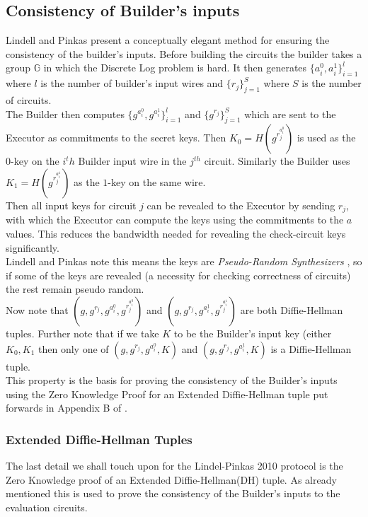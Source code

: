 \documentclass[ %
                    author={Nicholas Tutte},
                supervisor={Prof. Nigel Smart},
                    degree={MEng},
                     title={Secure Two Party Computation},
                  subtitle={A practical comparison of recent protocols},
                      type={Research - GG1K},
                      year={2015} ]{dissertation}
\begin{document}
			\subsection{Consistency of Builder's inputs}
				Lindell and Pinkas present a conceptually elegant method for ensuring the consistency of the builder's inputs. Before building the circuits the builder takes a group $\mathbb{G}$ in which the Discrete Log problem is hard. It then generates $\{a_i^0, a_i^1\}_{i = 1}^{l}$ where $l$ is the number of builder's input wires and $\{r_j\}_{j = 1}^{S}$ where $S$ is the number of circuits.\\

				The Builder then computes $\{g^{a_i^0}, g^{a_i^1}\}_{i = 1}^{l}$ and $\{g^{r_j}\}_{j = 1}^{S}$ which are sent to the Executor as commitments to the secret keys. Then $K_0 = H(g^{r_j^{a_i^0}})$ is used as the $0$-key on the $i^th$ Builder input wire in the $j^{th}$ circuit. Similarly the Builder uses $K_1 = H(g^{r_j^{a_i^1}})$ as the $1$-key on the same wire.\\

				Then all input keys for circuit $j$ can be revealed to the Executor by sending $r_j$, with which the Executor can compute the keys using the commitments to the $a$ values. This reduces the bandwidth needed for revealing the check-circuit keys significantly.\\

				Lindell and Pinkas note this means the keys are \emph{Pseudo-Random Synthesizers} \cite{PseudoRandomSynth}, so if some of the keys are revealed (a necessity for checking correctness of circuits) the rest remain pseudo random.\\

				Now note that $(g, g^{r_j}, g^{a_i^0}, g^{r_j^{a_i^0}})$ and $(g, g^{r_j}, g^{a_i^1}, g^{r_j^{a_i^1}})$ are both Diffie-Hellman tuples. Further note that if we take $K$ to be the Builder's input key (either $K_0, K_1$  then only one of $(g, g^{r_j}, g^{a_i^0}, K)$ and $(g, g^{r_j}, g^{a_i^1}, K)$ is a Diffie-Hellman tuple.\\

				This property is the basis for proving the consistency of the Builder's inputs using the Zero Knowledge Proof for an Extended Diffie-Hellman tuple put forwards in Appendix B of \cite{LindellAndPinkas2011}.

				\subsubsection{Extended Diffie-Hellman Tuples}
					The last detail we shall touch upon for the Lindel-Pinkas 2010 protocol is the Zero Knowledge proof of an Extended Diffie-Hellman(DH) tuple. As already mentioned this is used to prove the consistency of the Builder's inputs to the evaluation circuits.\\
\end{document}
